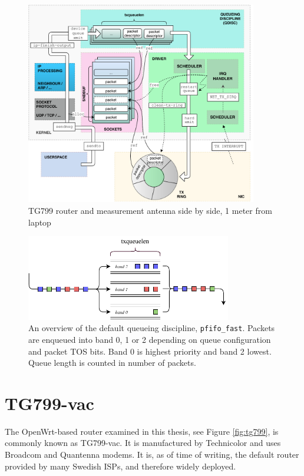 \begin{figure}
\center
\includegraphics[width=0.9\textwidth]{images/linux-egress-overview.pdf}
\caption{TG799 router and measurement antenna side by side, 1 meter from laptop}
\label{fig:linux_egress}
\end{figure}

\begin{figure}
\center
\includegraphics[width=0.8\textwidth]{images/pfifo-fast-queue.pdf}
\caption{An overview of the default queueing discipline, \texttt{pfifo\_fast}. Packets are enqueued into band 0, 1 or 2 depending on queue configuration and packet TOS bits. Band 0 is highest priority and band 2 lowest. Queue length is counted in number of packets.}
\label{fig:pfifofast}
\end{figure}

\section{TG799-vac}

The OpenWrt-based router examined in this thesis, see Figure \ref{fig:tg799}, is
commonly known as TG799-vac. It is manufactured by Technicolor and uses Broadcom 
and Quantenna modems. It is, as of time of writing, the default router provided 
by many Swedish ISPs, and therefore widely deployed.

